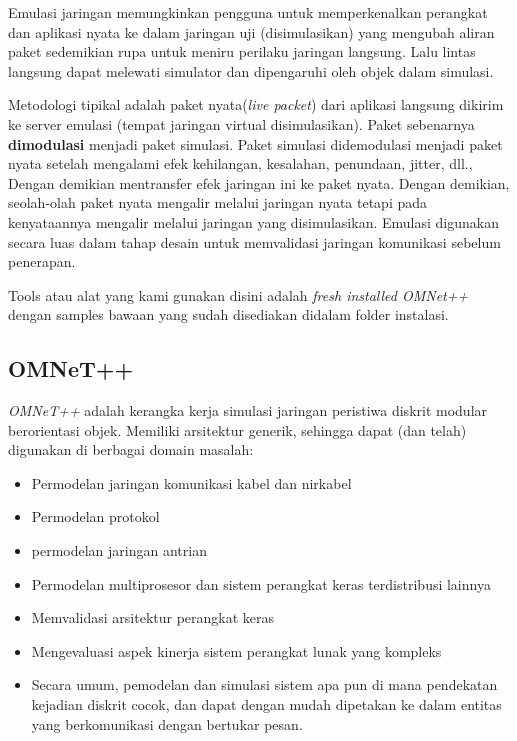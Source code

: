 \documentclass[conference]{IEEEtran}
\begin{document}
Emulasi jaringan memungkinkan pengguna untuk memperkenalkan perangkat dan aplikasi nyata ke dalam jaringan uji (disimulasikan) yang mengubah aliran paket sedemikian rupa untuk meniru perilaku jaringan langsung. Lalu lintas langsung dapat melewati simulator dan dipengaruhi oleh objek dalam simulasi.

Metodologi tipikal adalah paket nyata(\textit{live packet}) dari aplikasi langsung dikirim ke server emulasi (tempat jaringan virtual disimulasikan). Paket sebenarnya \textbf{dimodulasi} menjadi paket simulasi. Paket simulasi didemodulasi menjadi paket nyata setelah mengalami efek kehilangan, kesalahan, penundaan, jitter, dll., Dengan demikian mentransfer efek jaringan ini ke paket nyata. Dengan demikian, seolah-olah paket nyata mengalir melalui jaringan nyata tetapi pada kenyataannya mengalir melalui jaringan yang disimulasikan. Emulasi digunakan secara luas dalam tahap desain untuk memvalidasi jaringan komunikasi sebelum penerapan.

Tools atau alat yang kami gunakan disini adalah \textit{fresh installed OMNet++} dengan samples bawaan yang sudah disediakan didalam folder instalasi.

\subsection{OMNeT++}
\textit{OMNeT++} adalah kerangka kerja simulasi jaringan peristiwa diskrit modular berorientasi objek. Memiliki arsitektur generik, sehingga dapat (dan telah) digunakan di berbagai domain masalah:

\begin{itemize}
	\item Permodelan jaringan komunikasi kabel dan nirkabel
	\item Permodelan protokol
	\item permodelan jaringan antrian
	\item Permodelan multiprosesor dan sistem perangkat keras terdistribusi lainnya
	\item Memvalidasi arsitektur perangkat keras
	\item Mengevaluasi aspek kinerja sistem perangkat lunak yang kompleks
	\item Secara umum, pemodelan dan simulasi sistem apa pun di mana pendekatan kejadian diskrit cocok, dan dapat dengan mudah dipetakan ke dalam entitas yang berkomunikasi dengan bertukar pesan.
\end{itemize}
\end{document}
